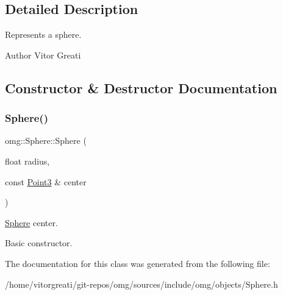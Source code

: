 \subsection{Detailed Description}
Represents a sphere. 

\begin{DoxyAuthor}{Author}
Vitor Greati 
\end{DoxyAuthor}


\subsection{Constructor \& Destructor Documentation}
\mbox{\label{classomg_1_1_sphere_a81f9a5180b9c883ce00669d4af4d38db}} 
\subsubsection{\texorpdfstring{Sphere()}{Sphere()}}
{\footnotesize\ttfamily omg\+::\+Sphere\+::\+Sphere (\begin{DoxyParamCaption}\item[{float}]{radius,  }\item[{const \mbox{\hyperlink{namespaceomg_af85242d35fdacf829d32a6f9b95f3e35}{Point3}} \&}]{center }\end{DoxyParamCaption})\hspace{0.3cm}{\ttfamily [inline]}}



\mbox{\hyperlink{classomg_1_1_sphere}{Sphere}} center. 

Basic constructor. 

The documentation for this class was generated from the following file\+:\begin{DoxyCompactItemize}
\item 
/home/vitorgreati/git-\/repos/omg/sources/include/omg/objects/Sphere.\+h\end{DoxyCompactItemize}
